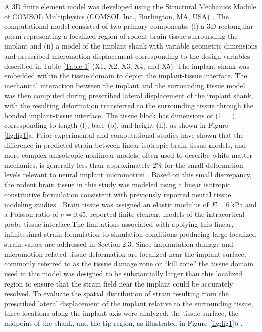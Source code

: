 \documentclass[fleqn,10pt]{wlscirep}
\begin{document}
A 3D finite element model was developed using the Structural Mechanics Module of COMSOL Multiphysics (COMSOL Inc., Burlington, MA, USA) \cite{Bathe1996}. The computational model consisted of two primary components: (i) a 3D rectangular prism representing a localized region of rodent brain tissue surrounding the implant \cite{Subbaroyan2005, AlAbed2022, Polanco2012} and (ii) a model of the implant shank with variable geometric dimensions and prescribed micromotion displacement corresponding to the design variables described in Table \ref{Table 1} (X1, X2, X3, X4, and X5). The implant shank was embedded within the tissue domain to depict the implant-tissue interface. The mechanical interaction between the implant and the surrounding tissue model was then computed during prescribed lateral displacement of the implant shank, with the resulting deformation transferred to the surrounding tissue through the bonded implant-tissue interface. The tissue block has dimensions of (1~~~), corresponding to length (l), base (b), and height (h), as shown in Figure \ref{fig:fig1}a. Prior experimental and computational studies have shown that the difference in predicted strain between linear isotropic brain tissue models, and more complex anisotropic nonlinear models, often used to describe white matter mechanics, is generally less than approximately 2\% for the small deformation levels relevant to neural implant micromotion \cite{Subbaroyan2005, Prange2002, Taylor2004, Feng2013}. Based on this small discrepancy, the rodent brain tissue in this study was modeled using a linear isotropic constitutive formulation consistent with previously reported neural tissue modeling studies \cite{Subbaroyan2005, AlAbed2022}. Brain tissue was assigned an elastic modulus of $E = 6~\text{kPa}$ and a Poisson ratio of $\nu = 0.45$, reported finite element models of the intracortical probe-tissue interface\cite{Subbaroyan2005, AlAbed2022}.The limitations associated with applying this linear, infinitesimal-strain formulation to simulation conditions producing large localized strain values are addressed in Section 2.3. Since implantation damage and micromotion-related tissue deformation are localized near the implant surface, commonly referred to as the tissue damage zone or ``kill zone'' \cite{Edell1992, Buzsaki2004} the tissue domain used in this model was designed to be substantially larger than this localized region to ensure that the strain field near the implant could be accurately resolved. To evaluate the spatial distribution of strain resulting from the prescribed lateral displacement of the implant relative to the surrounding tissue, three locations along the implant axis were analyzed: the tissue surface, the midpoint of the shank, and the tip region, as illustrated in Figure \ref{fig:fig1}b .
\end{document}
